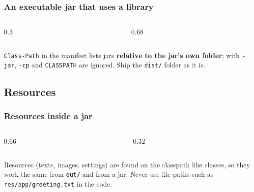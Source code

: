 \documentclass[aspectratio=169,10pt,compress]{beamer}
\begin{document}
\begin{frame}[t,fragile] \frametitle{An executable jar that uses a library}
  \begin{columns}[T]
    \begin{column}{0.3\textwidth}
    \end{column}
    \begin{column}{0.68\textwidth}
    \end{column}
  \end{columns}

  \vspace{0.2em}
  \small \texttt{Class-Path} in the manifest lists jars \textbf{relative to the jar's own folder}; with \texttt{-jar},
  \texttt{-cp} and \texttt{CLASSPATH} are ignored. Ship the \texttt{dist/} folder as it is.
\end{frame}

\subsection[Resources]{Resources}




\begin{frame}[t,fragile] \frametitle{Resources inside a jar}
  \begin{columns}[T]
    \begin{column}{0.66\textwidth}
    \end{column}
    \begin{column}{0.32\textwidth}
    \end{column}
  \end{columns}

  \vspace{0.2em}
  \small Resources (texts, images, settings) are found on the classpath like classes, so they work the same
  from \texttt{out/} and from a jar. Never use file paths such as \texttt{res/app/greeting.txt} in the code.
\end{frame}
\end{document}
